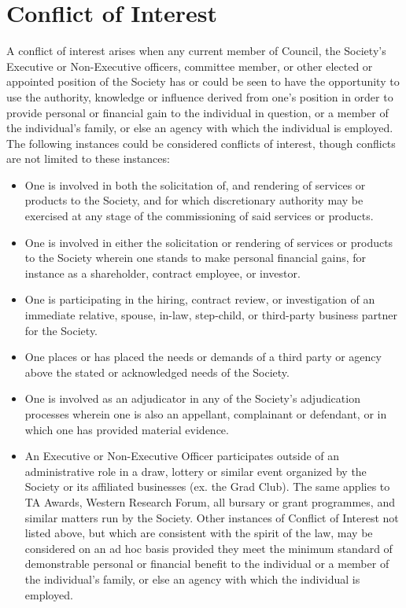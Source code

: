 \section{Conflict of Interest}
\begin{longenum}[ label*=\thesection.\arabic*., align=left]
	\item A conflict of interest arises when any current member of Council, the Society's Executive or Non-Executive officers, committee member, or other elected or appointed position of the Society has or could be seen to have the opportunity to use the authority, knowledge or influence derived from one's position in order to provide personal or financial gain to the individual in question, or a member of the individual's family, or else an agency with which the individual is employed. The following instances could be  considered conflicts of interest, though conflicts are not limited to these instances: 
    \begin{itemize}
    	\item One is involved in both the solicitation of, and rendering of services or products to the Society, and for  which discretionary authority may be exercised at any stage  of the commissioning of said services or products.
        \item One is involved in either the solicitation or rendering of services or products to the Society wherein one stands to make personal financial gains, for instance as a shareholder, contract employee, or investor.
        \item One is participating in the hiring, contract review, or investigation of an immediate relative, spouse, in-law, step-child, or third-party business partner for the Society. 
        \item One places or has placed the needs or demands of a third party or agency above the stated or acknowledged needs of the Society. 
        \item One is involved as an adjudicator in any of the Society's adjudication processes wherein one is also an appellant, complainant or defendant, or in which one has provided material evidence.
        \item An Executive or Non-Executive Officer participates outside of an administrative role in a draw, lottery or similar event organized by the Society or its affiliated businesses (ex. the Grad Club). The same applies to TA Awards, Western Research Forum, all bursary or grant programmes, and similar matters run by the Society. Other instances of Conflict of Interest not listed above, but which are consistent with the spirit of the law, may be considered on an ad hoc basis provided they meet the minimum standard of demonstrable personal or financial benefit to the individual or a member of the individual's family,  or else an agency with which the individual is employed.

\end{itemize}
\end{longenum}
